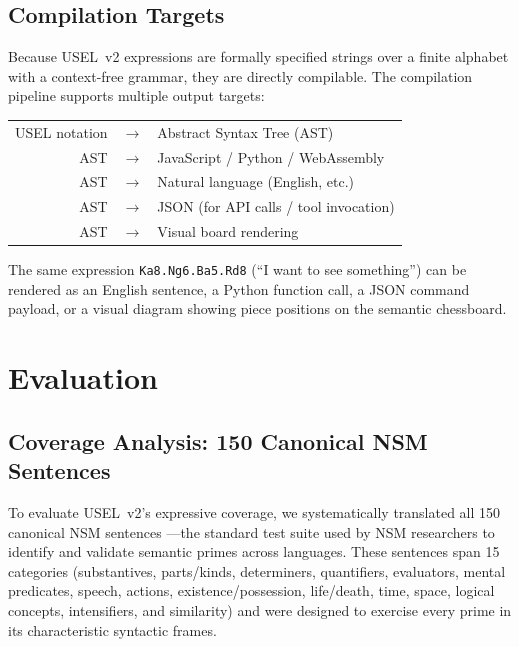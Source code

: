 \documentclass[11pt,a4paper]{article}
\begin{document}
\subsection{Compilation Targets}
\label{sec:compilation}

Because USEL~v2 expressions are formally specified strings over a finite alphabet with a context-free grammar, they are directly compilable. The compilation pipeline supports multiple output targets:

\begin{center}
\begin{tabular}{rcl}
USEL notation & $\rightarrow$ & Abstract Syntax Tree (AST) \\
AST & $\rightarrow$ & JavaScript / Python / WebAssembly \\
AST & $\rightarrow$ & Natural language (English, etc.) \\
AST & $\rightarrow$ & JSON (for API calls / tool invocation) \\
AST & $\rightarrow$ & Visual board rendering \\
\end{tabular}
\end{center}

The same expression \texttt{Ka8.Ng6.Ba5.Rd8} (``I want to see something'') can be rendered as an English sentence, a Python function call, a JSON command payload, or a visual diagram showing piece positions on the semantic chessboard.

\section{Evaluation}
\label{sec:evaluation}

\subsection{Coverage Analysis: 150 Canonical NSM Sentences}
\label{sec:coverage}

To evaluate USEL~v2's expressive coverage, we systematically translated all 150 canonical NSM sentences \citep{goddard2017canonical}---the standard test suite used by NSM researchers to identify and validate semantic primes across languages. These sentences span 15 categories (substantives, parts/kinds, determiners, quantifiers, evaluators, mental predicates, speech, actions, existence/possession, life/death, time, space, logical concepts, intensifiers, and similarity) and were designed to exercise every prime in its characteristic syntactic frames.
\end{document}
